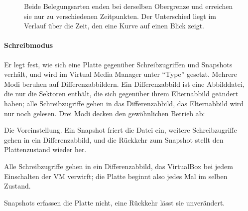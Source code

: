\begin{figure}[H]
\centering
{}
\caption[Fester und dynamisch wachsender Plattenplatz im Zeitverlauf]{Beide Belegungsarten enden bei derselben Obergrenze und erreichen sie nur zu verschiedenen Zeitpunkten. Der Unterschied liegt im Verlauf über die Zeit, den eine Kurve auf einen Blick zeigt.}
\label{abb:platte}
\end{figure}

\paragraph{Schreibmodus} Er legt fest, wie sich eine Platte gegenüber Schreibzugriffen und Snapshots verhält, und wird im Virtual Media Manager unter \enquote{Type} gesetzt. Mehrere Modi beruhen auf Differenzabbildern. Ein Differenzabbild ist eine Abbilddatei, die nur die Sektoren enthält, die sich gegenüber ihrem Elternabbild geändert haben; alle Schreibzugriffe gehen in das Differenzabbild, das Elternabbild wird nur noch gelesen. Drei Modi decken den gewöhnlichen Betrieb ab:

\begin{description}[nosep]
  \item[normal] Die Voreinstellung. Ein Snapshot friert die Datei ein, weitere Schreibzugriffe gehen in ein Differenzabbild, und die Rückkehr zum Snapshot stellt den Plattenzustand wieder her.
  \item[immutable] Alle Schreibzugriffe gehen in ein Differenzabbild, das VirtualBox bei jedem Einschalten der VM verwirft; die Platte beginnt also jedes Mal im selben Zustand.
  \item[write-through] Snapshots erfassen die Platte nicht, eine Rückkehr lässt sie unverändert.
\end{description}

